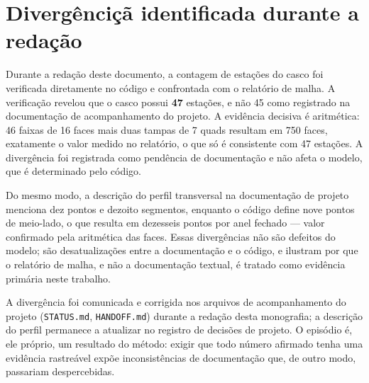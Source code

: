 \section{Diverg\^enci{\c{c}}\~a identificada durante a reda{\c{c}}\~ao}

Durante a reda{\c{c}}\~ao deste documento, a contagem de esta{\c{c}}\~oes do casco foi
verificada diretamente no c\'odigo e confrontada com o relat\'orio de malha. A verifica{\c{c}}\~ao
revelou que o casco possui \textbf{47} esta{\c{c}}\~oes, e n\~ao 45 como registrado na
documenta{\c{c}}\~ao de acompanhamento do projeto. A evid\^encia decisiva \'e aritm\'etica:
46 faixas de 16 faces mais duas tampas de 7 quads resultam em 750 faces, exatamente o valor
medido no relat\'orio, o que s\'o \'e consistente com 47 esta{\c{c}}\~oes. A diverg\^encia foi
registrada como pend\^encia de documenta{\c{c}}\~ao e n\~ao afeta o modelo, que \'e
determinado pelo c\'odigo.

Do mesmo modo, a descri{\c{c}}\~ao do perfil transversal na documenta{\c{c}}\~ao de projeto
menciona dez pontos e dezoito segmentos, enquanto o c\'odigo define nove pontos de meio-lado,
o que resulta em dezesseis pontos por anel fechado --- valor confirmado pela aritm\'etica das
faces. Essas diverg\^encias n\~ao s\~ao defeitos do modelo; s\~ao desatualiza{\c{c}}\~oes entre
a documenta{\c{c}}\~ao e o c\'odigo, e ilustram por que o relat\'orio de malha, e n\~ao a
documenta{\c{c}}\~ao textual, \'e tratado como evid\^encia prim\'aria neste trabalho.

A diverg\^encia foi comunicada e corrigida nos arquivos de acompanhamento do projeto
(\texttt{STATUS.md}, \texttt{HANDOFF.md}) durante a reda{\c{c}}\~ao desta monografia; a
descri{\c{c}}\~ao do perfil permanece a atualizar no registro de decis\~oes de projeto. O
epis\'odio \'e, ele pr\'oprio, um resultado do m\'etodo: exigir que todo n\'umero afirmado
tenha uma evid\^encia rastre\'avel exp\~oe inconsist\^encias de documenta{\c{c}}\~ao que, de
outro modo, passariam despercebidas.
